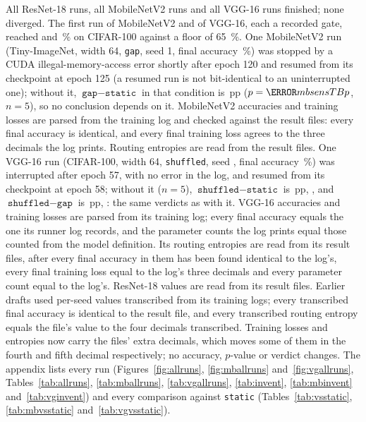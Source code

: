 \documentclass[10pt,a4paper]{article}
\begin{document}
All  ResNet-18 runs, all  MobileNetV2 runs and all
 VGG-16 runs finished; none diverged. The first run of
MobileNetV2 and of VGG-16, each a recorded gate, reached  and
\,\% on CIFAR-100 against a floor of \SI{65}{\percent}. One
MobileNetV2 run (Tiny-ImageNet, width 64, \texttt{gap}, seed 1, final
accuracy \,\%) was stopped by a CUDA illegal-memory-access
error shortly after epoch 120 and resumed from its checkpoint at epoch 125
(a resumed run is not bit-identical to an uninterrupted one); without it, $\texttt{gap}-\texttt{static}$ in
that condition is \,pp ($p=\V{mbsensTBp}$, $n=5$), so no
conclusion depends on it. MobileNetV2 accuracies and training losses are
parsed from the training log and checked against the  result
files: every final accuracy is identical, and every final training loss
agrees to the three decimals the log prints. Routing entropies are read
from the result files. One VGG-16 run (CIFAR-100, width 64,
\texttt{shuffled}, seed , final accuracy
\,\%) was interrupted after epoch 57, with no error in
the log, and resumed from its checkpoint at epoch 58; without it
($n=5$), $\texttt{shuffled}-\texttt{static}$ is \,pp,
, and $\texttt{shuffled}-\texttt{gap}$ is \,pp,
: the same verdicts as with it. VGG-16 accuracies and
training losses are parsed from its training log; every final accuracy
equals the one its runner log records, and the parameter counts the log
prints equal those counted from the model definition. Its routing
entropies are read from its  result files, after every final
accuracy in them has been found identical to the log's, every final
training loss equal to the log's three decimals and every parameter count
equal to the log's. ResNet-18 values are read from its  result
files. Earlier drafts used per-seed values transcribed from its training
logs; every transcribed final accuracy is identical to the result file, and
every transcribed routing entropy equals the file's value to the four
decimals transcribed. Training losses and entropies now carry the files'
extra decimals, which moves some of them in the fourth and fifth decimal
respectively; no accuracy, $p$-value or verdict changes. The appendix lists every run
(Figures~\ref{fig:allruns}, \ref{fig:mballruns} and~\ref{fig:vgallruns},
Tables~\ref{tab:allruns}, \ref{tab:mballruns}, \ref{tab:vgallruns},
\ref{tab:invent}, \ref{tab:mbinvent} and~\ref{tab:vginvent}) and every
comparison against \texttt{static} (Tables~\ref{tab:vsstatic},
\ref{tab:mbvsstatic} and~\ref{tab:vgvsstatic}).
\end{document}

